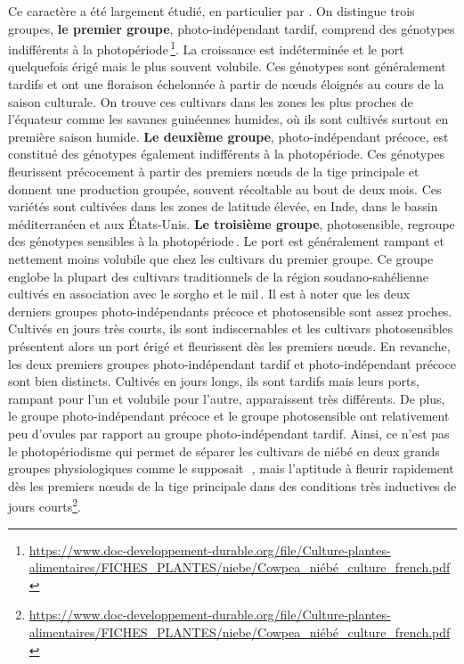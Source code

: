 \documentclass[a4paper,11pt]{article}
\begin{document}
Ce caractère a été largement étudié, en particulier
par\,\citeauthor{Steele_1972}\,\citeyear{Steele_1972}. On distingue
trois groupes, \textbf{le premier groupe}, photo-indépendant tardif,
comprend des génotypes indifférents à la
photopériode\,\footnote{\url{https://www.doc-developpement-durable.org/file/Culture-plantes-alimentaires/FICHES_PLANTES/niebe/Cowpea_niébé_culture_french.pdf}}. La
croissance est indéterminée et le port quelquefois érigé mais le plus
souvent volubile. Ces génotypes sont généralement tardifs et ont une
floraison échelonnée à partir de nœuds éloignés au cours de la saison
culturale. On trouve ces cultivars dans les zones les plus proches de
l’équateur comme les savanes guinéennes humides, où ils sont cultivés
surtout en première saison humide. \textbf{Le deuxième groupe},
photo-indépendant précoce, est constitué des génotypes également
indifférents à la photopériode. Ces génotypes fleurissent précocement
à partir des premiers nœuds de la tige principale et donnent une
production groupée, souvent récoltable au bout de deux mois. Ces
variétés sont cultivées dans les zones de latitude élevée, en Inde,
dans le bassin méditerranéen et aux États-Unis. \textbf{Le troisième
  groupe}, photosensible, regroupe des génotypes sensibles à la
photopériode\,\cite{Steele_1972}. Le port est généralement rampant et
nettement moins volubile que chez les cultivars du premier groupe. Ce
groupe englobe la plupart des cultivars traditionnels de la région
soudano-sahélienne cultivés en association avec le sorgho et le
mil\,\cite{Doggett_1988}. Il est à noter que les deux derniers groupes
photo-indépendants précoce et photosensible sont assez
proches. Cultivés en jours très courts, ils sont indiscernables et les
cultivars photosensibles présentent alors un port érigé et fleurissent
dès les premiers nœuds. En revanche, les deux premiers groupes
photo-indépendant tardif et photo-indépendant précoce sont bien
distincts. Cultivés en jours longs, ils sont tardifs mais leurs ports,
rampant pour l’un et volubile pour l’autre, apparaissent très
différents. De plus, le groupe photo-indépendant précoce et le groupe
photosensible ont relativement peu d’ovules par rapport au groupe
photo-indépendant tardif. Ainsi, ce n’est pas le photopériodisme qui
permet de séparer les cultivars de niébé en deux grands groupes
physiologiques comme le supposait
\,\citeauthor{Steele_1972}\,\citeyear{Steele_1972}, mais l’aptitude à
fleurir rapidement dès les premiers nœuds de la tige principale dans
des conditions très inductives de jours
courts\footnote{\url{https://www.doc-developpement-durable.org/file/Culture-plantes-alimentaires/FICHES_PLANTES/niebe/Cowpea_niébé_culture_french.pdf}}.
\end{document}
